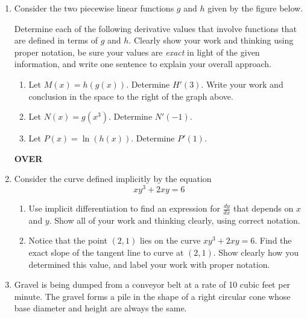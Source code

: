 \documentclass[11 pt]{article}
\newcommand{\lr}{\vspace{1.0in}}
\newcommand{\mr}{\vspace{2.0in}}
\newcommand{\br}{\vspace{3.0in}}
\newcommand{\be}{\begin{enumerate}}
\newcommand{\ee}{\end{enumerate}}
\begin{document}
  \begin{enumerate}

	\item[9.]  Consider the two piecewise linear functions $g$ and $h$ given by the figure below.
	
 


Determine each of the following derivative values that involve functions that are defined in terms of $g$ and $h$.  Clearly show your work and thinking using proper notation, be sure your values are \emph{exact} in light of the given information, and write one sentence to explain your overall approach.

	\be
		\item Let $M(x) = h(g(x))$.  Determine $H'(3)$.  Write your work and conclusion in the space to the right of the graph above.
		
		\item Let $N(x) = g(x^3)$.  Determine $N'(-1)$.
		
		\mr
		
		\item Let $P(x) = \ln(h(x))$.  Determine $P'(1)$.
	\ee

	\vfill \hfill {\bf OVER}

\pagebreak

	\item[10.]  Consider the curve defined implicitly by the equation
	$$xy^3 + 2xy = 6$$
	
	\be
	
		\item Use implicit differentiation to find an expression for $\frac{dy}{dx}$ that depends on $x$ and $y$.  Show all of your work and thinking clearly, using correct notation.
		
		\br \lr
		
		\item Notice that the point $(2,1)$ lies on the curve $xy^3 + 2xy = 6$.  Find the exact slope of the tangent line to curve at $(2,1)$.  Show clearly how you determined this value, and label your work with proper notation.
	
	\ee

\pagebreak

	\item[11.]   Gravel is being dumped from a conveyor belt at a rate of 10 cubic feet per minute. The gravel forms a pile in the shape of a right circular cone whose base diameter and height are always the same. 
	

\end{enumerate}
\end{document}

